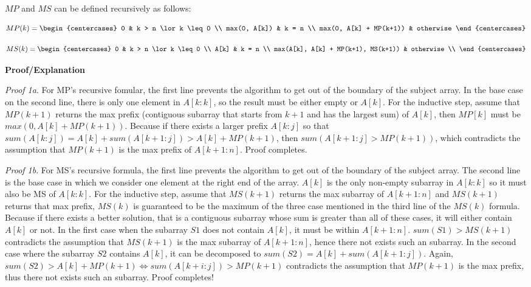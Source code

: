 \documentclass[12pt,article]{article}
\begin{document}
$MP$ and $MS$ can be defined recursively as follows:

\small{
    \[
        MP(k)=
        \begin{centercases}
            0                          & k > n \lor k \leq 0 \\
            max(0, A[k])               & k = n \\
            max(0, A[k] + MP(k+1))        & otherwise
        \end{centercases}
        \]
}

\small{
    \[
        MS(k)=
        \begin{centercases}
            0                  & k > n \lor k \leq 0 \\
            A[k]               & k = n \\
            max(A[k], A[k] + MP(k+1), MS(k+1))     & otherwise \\
        \end{centercases}
        \]
}

\normalsize{}

\textbf{Proof/Explanation}

\textit{Proof 1a}. For MP's recursive fomular, the first line prevents the algorithm to get out of the boundary of the subject array. In the base case on the second line, there is only one element in $A[k:k]$, so the result must be either empty or $A[k]$. For the inductive step, assume that $MP(k+1)$ returns the max prefix (contiguous subarray that starts from $k+1$ and has the largest sum) of $A[k]$, then $MP[k]$ must be $max(0, A[k] + MP(k+1))$. Because if there exists a larger prefix $A[k:j]$ so that $sum(A[k:j]) = A[k] + sum(A[k+1:j]) > A[k] + MP(k+1)$, then $sum(A[k+1:j] > MP(k+1))$, which contradicts the assumption that $MP(k+1)$ is the max prefix of $A[k+1:n]$. Proof completes.

\textit{Proof 1b}. For MS's recursive formula, the first line prevents the algorithm to get out of the boundary of the subject array. The second line is the base case in which we consider one element at the right end of the array. $A[k]$ is the only non-empty subarray in $A[k:k]$ so it must also be MS of $A[k:k]$. For the inductive step, assume that $MS(k+1)$ returns the max subarray of $A[k+1:n]$ and $MS(k+1)$ returns that max prefix, $MS(k)$ is guaranteed to be the maximum of the three case mentioned in the third line of the $MS(k)$ formula. Because if there exists a better solution, that is a contiguous subarray whose sum is greater than all of these cases, it will either contain $A[k]$ or not. In the first case when the subarray $S1$ does not contain $A[k]$, it must be within $A[k+1:n]$. $sum(S1) > MS(k+1)$ contradicts the assumption that $MS(k+1)$ is the max subarray of $A[k+1:n]$, hence there not exists such an subarray. In the second case where the subarray $S2$ contains $A[k]$, it can be decomposed to $sum(S2) = A[k] + sum(A[k+1:j])$. Again, $sum(S2) > A[k] + MP(k+1) \iff sum(A[k+i:j]) > MP(k+1)$ contradicts the assumption that $MP(k+1)$ is the max prefix, thus there not exists such an subarray. Proof completes!
\end{document}
